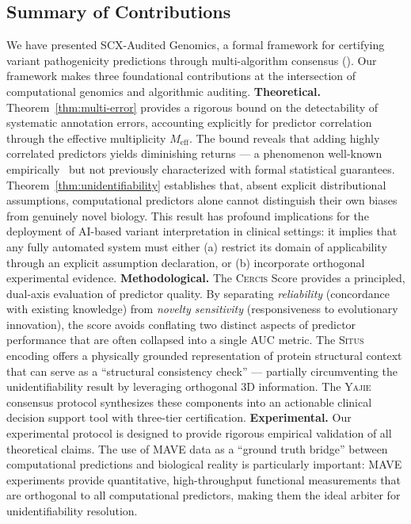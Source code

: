 \documentclass[11pt,a4paper]{article}
\theoremstyle{definition}
\newcommand{\SCX}{\textsc{SCX}}
\newcommand{\situs}{\textsc{Situs}}
\newcommand{\cercis}{\textsc{Cercis}}
\newcommand{\yajie}{\textsc{Yajie}}
\newcommand{\multiconsensus}{}
\begin{document}
\subsection{Summary of Contributions}
We have presented \SCX-Audited Genomics, a formal framework for certifying variant pathogenicity predictions through multi-algorithm consensus (\multiconsensus{}).
Our framework makes three foundational contributions at the intersection of computational genomics and algorithmic auditing.
\textbf{Theoretical.}
Theorem~\ref{thm:multi-error} provides a rigorous bound on the detectability of systematic annotation errors, accounting explicitly for predictor correlation through the effective multiplicity $M_{\text{eff}}$.
The bound reveals that adding highly correlated predictors yields diminishing returns — a phenomenon well-known empirically~\cite{pejaver2022evidence} but not previously characterized with formal statistical guarantees.
Theorem~\ref{thm:unidentifiability} establishes that, absent explicit distributional assumptions, computational predictors alone cannot distinguish their own biases from genuinely novel biology.
This result has profound implications for the deployment of AI-based variant interpretation in clinical settings: it implies that any fully automated system must either (a) restrict its domain of applicability through an explicit assumption declaration, or (b) incorporate orthogonal experimental evidence.
\textbf{Methodological.}
The \cercis{} Score provides a principled, dual-axis evaluation of predictor quality.
By separating \textit{reliability} (concordance with existing knowledge) from \textit{novelty sensitivity} (responsiveness to evolutionary innovation), the score avoids conflating two distinct aspects of predictor performance that are often collapsed into a single AUC metric.
The \situs{} encoding offers a physically grounded representation of protein structural context that can serve as a ``structural consistency check'' — partially circumventing the unidentifiability result by leveraging orthogonal 3D information.
The \yajie{} consensus protocol synthesizes these components into an actionable clinical decision support tool with three-tier certification.
\textbf{Experimental.}
Our experimental protocol is designed to provide rigorous empirical validation of all theoretical claims.
The use of MAVE data as a ``ground truth bridge'' between computational predictions and biological reality is particularly important: MAVE experiments provide quantitative, high-throughput functional measurements that are orthogonal to all computational predictors, making them the ideal arbiter for unidentifiability resolution.
\end{document}

